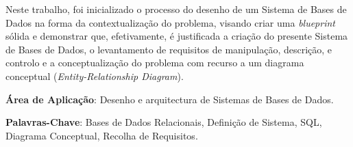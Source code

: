 \documentclass[a4paper,12pt]{scrreprt}
\begin{document}


\makecover



    
    






\renewenvironment{abstract}
 {\par\noindent\textbf{\Large\abstractname}\par\bigskip}
 {}

\begin{flushleft}
\begin{abstract}
    Neste trabalho, foi inicializado o processo do desenho de um Sistema de Bases de Dados na forma da
    contextualiza\c{c}\~ao do problema, visando criar uma \textit{blueprint} s\'olida e demonstrar que, efetivamente,
    \'e justificada a cria\c{c}\~ao do presente Sistema de Bases de Dados,
    o levantamento de requisitos de manipulação, descrição, e controlo e a conceptualização do
    problema com recurso a um diagrama conceptual (\textit{Entity-Relationship Diagram}).
    \par \textbf{\'Area de Aplicação}: Desenho e arquitectura de Sistemas de Bases de Dados.
    \par \textbf{Palavras-Chave}: Bases de Dados Relacionais, Defini\c{c}\~ao de Sistema, SQL, Diagrama Conceptual,
    Recolha de Requisitos.
\end{abstract}
\end{flushleft}
\end{document}
